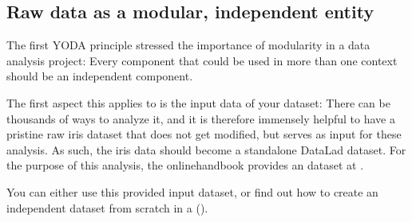 \subsection{Raw data as a modular, independent entity}
\label{\detokenize{basics/101-130-yodaproject:raw-data-as-a-modular-independent-entity}}
\sphinxAtStartPar
The first YODA principle stressed the importance of modularity in a data analysis
project: Every component that could be used in more than one context should be
an independent component.

\sphinxAtStartPar
The first aspect this applies to is the input data of your dataset: There can
be thousands of ways to analyze it, and it is therefore immensely helpful to
have a pristine raw iris dataset that does not get modified, but serves as
input for these analysis.
As such, the iris data should become a standalone DataLad dataset.
For the purpose of this analysis, the online\sphinxhyphen{}handbook provides an 
dataset at .

\sphinxAtStartPar
You can either use this provided input dataset, or find out how to create an
independent dataset from scratch in a {\hyperref[\detokenize{basics/101-130-yodaproject:fom-iris}]{}} ().


